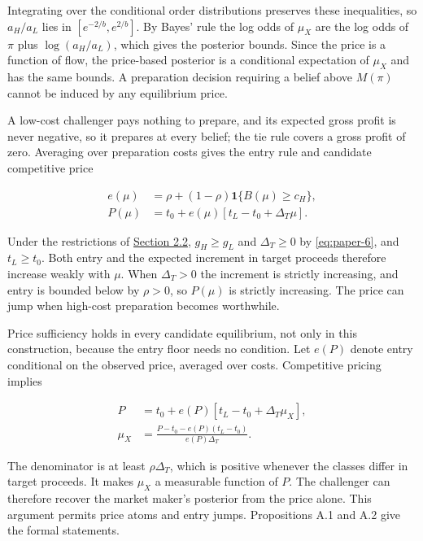 Integrating over the conditional order distributions preserves these
inequalities, so \(a_H/a_L\) lies in \([e^{-2/b},e^{2/b}]\). By Bayes'
rule the log odds of \(\mu_X\) are the log odds of \(\pi\) plus
\(\log(a_H/a_L)\), which gives the posterior bounds. Since the price is
a function of flow, the price-based posterior is a conditional
expectation of \(\mu_X\) and has the same bounds. A preparation decision
requiring a belief above \(M(\pi)\) cannot be induced by any equilibrium
price.

A low-cost challenger pays nothing to prepare, and its expected gross
profit is never negative, so it prepares at every belief; the tie rule
covers a gross profit of zero. Averaging over preparation costs gives
the entry rule and candidate competitive price

\[
\begin{aligned}
e(\mu)&=\rho+(1-\rho)\mathbf1\{B(\mu)\ge c_H\},\\
P(\mu)&=t_0+e(\mu)[t_L-t_0+\Delta_T\mu].
\end{aligned}
\tag{9}\label{eq:paper-9}
\]

Under the restrictions of
\hyperref[sec-values-preparation-and-the-sale]{Section 2.2},
\(g_H\ge g_L\) and \(\Delta_T\ge0\) by \eqref{eq:paper-6}, and
\(t_L\ge t_0\). Both entry and the expected increment in target
proceeds therefore increase weakly with \(\mu\). When \(\Delta_T>0\) the
increment is strictly increasing, and entry is bounded below by
\(\rho>0\), so \(P(\mu)\) is strictly increasing. The price can jump
when high-cost preparation becomes worthwhile.

Price sufficiency holds in every candidate equilibrium, not only in this
construction, because the entry floor needs no condition. Let \(e(P)\)
denote entry conditional on the observed price, averaged over costs.
Competitive pricing implies

\[
\begin{aligned}
P&=t_0+e(P)[t_L-t_0+\Delta_T\mu_X],\\
\mu_X&=\frac{P-t_0-e(P)(t_L-t_0)}{e(P)\Delta_T}.
\end{aligned}
\tag{10}\label{eq:paper-10}
\]

The denominator is at least \(\rho\Delta_T\), which is positive whenever
the classes differ in target proceeds. It makes \(\mu_X\) a measurable
function of \(P\). The challenger can therefore recover the market
maker's posterior from the price alone. This argument permits price
atoms and entry jumps. Propositions A.1 and A.2 give the formal
statements.

